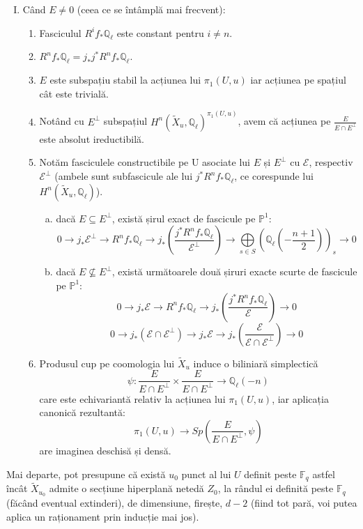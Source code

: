 \documentclass[13pt,openany]{book}
\begin{document}
\begin{teo}
\begin{enumerate}[I.]
\item Când $E\neq 0$ (ceea ce se întâmplă mai frecvent):
\begin{enumerate}[1.]
\item Fasciculul $R^i f_* \mathbb{Q}_\ell$ este constant pentru $i\neq n$.
\item $R^n f_* \mathbb{Q}_\ell = j_* j^* R^n f_* \mathbb{Q}_\ell$.
\item $E$ este subspațiu stabil la acțiunea lui $\pi_1(U,u)$ iar acțiunea pe spațiul cât este trivială.
\item Notând cu $E^\perp$ subspațiul $H^n(\widetilde{X}_u,\mathbb{Q}_\ell)^{\pi_1(U,u)}$, avem că acțiunea pe $\frac{E}{E \cap E^\perp}$ este absolut ireductibilă.
\item Notăm fasciculele constructibile pe U asociate lui $E$ și $E^\perp$ cu $\mathcal{E}$, respectiv $\mathcal{E}^\perp$ (ambele sunt subfascicule ale lui $j^* R^n f_* \mathbb{Q}_\ell$, ce corespunde lui $H^n(\widetilde{X}_u,\mathbb{Q}_\ell)$).
\begin{enumerate}[a)]
\item dacă $E \subseteq E^\perp$, există șirul exact de fascicule pe $\mathbb{P}^1$:
$$0 \rightarrow j_* \mathcal{E}^\perp \rightarrow R^n f_* \mathbb{Q}_\ell \rightarrow j_*(\frac{j^* R^n f_* \mathbb{Q}_\ell}{\mathcal{E}^\perp}) \rightarrow \bigoplus\limits_{s\in S} (\mathbb{Q}_\ell(-\frac{n+1}{2}))_s \rightarrow 0$$
\item dacă $E \nsubseteq E^\perp$, există următoarele două șiruri exacte scurte de fascicule pe $\mathbb{P}^1$:
$$0\rightarrow j_*\mathcal{E} \rightarrow R^n f_* \mathbb{Q}_\ell \rightarrow j_*(\frac{j^* R^n f_* \mathbb{Q}_\ell}{\mathcal{E}}) \rightarrow 0$$
$$0 \rightarrow j_*(\mathcal{E} \cap \mathcal{E}^\perp)  \rightarrow j_*\mathcal{E}  \rightarrow j_*(\frac{\mathcal{E}}{\mathcal{E} \cap \mathcal{E}^\perp})  \rightarrow 0$$
\end{enumerate}
\item Produsul cup pe coomologia lui $\widetilde{X}_u$ induce o biliniară simplectică
$$\psi : \frac{E}{E \cap E^\perp} \times \frac{E}{E \cap E^\perp} \rightarrow \mathbb{Q}_\ell(-n)$$
care este echivariantă relativ la acțiunea lui $\pi_1(U,u)$, iar aplicația canonică rezultantă:
$$\pi_1(U,u) \rightarrow Sp(\frac{E}{E \cap E^\perp},\psi)$$
are imaginea deschisă și densă.
\end{enumerate}
\end{enumerate}
\end{teo}

Mai departe, pot presupune că există $u_0$ punct al lui $U$ definit peste $\mathbb{F}_q$ astfel încât $\widetilde{X}_{u_0}$ admite o secțiune hiperplană netedă $Z_0$, la rândul ei definită peste $\mathbb{F}_q$ (făcând eventual extinderi), de dimensiune, firește, $d-2$ (fiind tot pară, voi putea aplica un raționament prin inducție mai jos).
\end{document}
